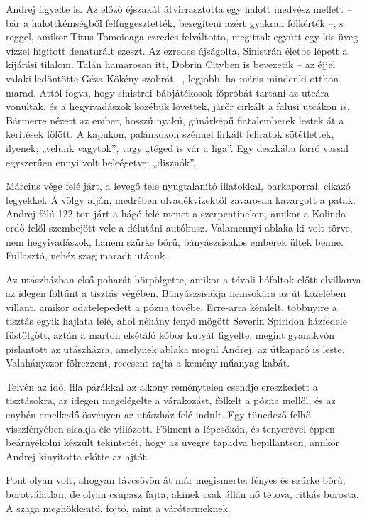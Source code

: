 \documentclass{IEEEtran}
\begin{document}
Andrej figyelte is. Az előző éjszakát átvirrasztotta egy halott medvész
mellett – bár a halottkémségből felfüggesztették, besegíteni azért gyakran
fölkérték –, s reggel, amikor Titus Tomoioaga ezredes felváltotta, megittak
együtt egy kis üveg vízzel hígított denaturált szeszt. Az ezredes újságolta,
Sinistrán életbe lépett a kijárási tilalom. Talán hamarosan itt, Dobrin
Cityben is bevezetik – az éjjel valaki ledöntötte Géza Kökény szobrát –,
legjobb, ha máris mindenki otthon marad. Attól fogva, hogy sinistrai
bábjátékosok főpróbát tartani az utcára vonultak, és a hegyivadászok közébük
lövettek, járőr cirkált a falusi utcákon is. Bármerre nézett az ember, hosszú
nyakú, gúnárképű fiatalemberek lestek át a kerítések fölött. A kapukon,
palánkokon szénnel firkált feliratok sötétlettek, ilyenek; „velünk vagytok”,
vagy „téged is vár a liga”. Egy deszkába forró vassal egyszerűen ennyi volt
beleégetve: „disznók”.

Március vége felé járt, a levegő tele nyugtalanító illatokkal, barkaporral,
cikázó legyekkel. A völgy alján, medrében olvadékvizektől zavarosan kavargott
a patak. Andrej félú 122 ton járt a hágó felé menet a szerpentineken, amikor a
Kolinda-erdő felől szembejött vele a délutáni autóbusz. Valamennyi ablaka ki
volt törve, nem hegyivadászok, hanem szürke bőrű, bányászsisakos emberek ültek
benne. Fullasztó, nehéz szag maradt utánuk.

Az utászházban első poharát hörpölgette, amikor a távoli hófoltok előtt
elvillanva az idegen föltűnt a tisztás végében. Bányászsisakja nemsokára az út
közelében villant, amikor odatelepedett a pózna tövébe. Erre-arra kémlelt,
többnyire a tisztás egyik hajlata felé, ahol néhány fenyő mögött Severin
Spiridon házfedele füstölgött, aztán a marton elsétáló kóbor kutyát figyelte,
megint gyanakvón pislantott az utászházra, amelynek ablaka mögül Andrej, az
útkaparó is leste. Valahányszor fölrezzent, reccsent rajta a kemény műanyag
kabát.

Telvén az idő, lila párákkal az alkony reménytelen csendje ereszkedett a
tisztásokra, az idegen megelégelte a várakozást, fölkelt a pózna mellől, és az
enyhén emelkedő ösvényen az utászház felé indult. Egy tünedező felhő
visszfényében sisakja éle villózott. Fölment a lépcsőkön, és tenyerével éppen
beárnyékolni készült tekintetét, hogy az üvegre tapadva bepillantson, amikor
Andrej kinyitotta előtte az ajtót.

Pont olyan volt, ahogyan távcsövön át már megismerte: fényes és szürke bőrű,
borotválatlan, de olyan csupasz fajta, akinek csak állán nő tétova, ritkás
borosta. A szaga meghökkentő, fojtó, mint a várótermeknek.
\end{document}
